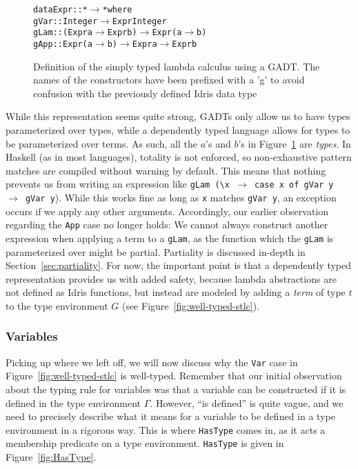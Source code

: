 \begin{figure}
\begin{alltt}
data Expr :: * \(\rightarrow\) * where
  gVar :: Integer \(\rightarrow\) Expr Integer
  gLam :: (Expr a \(\rightarrow\) Expr b) \(\rightarrow\) Expr (a \(\rightarrow\) b)
  gApp :: Expr (a \(\rightarrow\) b) \(\rightarrow\) Expr a \(\rightarrow\) Expr b 
\end{alltt}
\caption{Definition of the simply typed lambda calculus using a GADT. The names of the constructors have been prefixed with a 'g' to avoid confusion with the previously defined Idris data type}
\label{fig:stlc-GADT}
\end{figure}
While this representation seems quite strong, GADTs only allow us to have types parameterized over types, while a dependently typed language allows for types to be parameterized over terms. As such, all the $a$'s and $b$'s in Figure~\ref{fig:stlc-GADT} are \emph{types}. In Haskell (as in most languages), totality is not enforced, so non-exhaustive pattern matches are compiled without warning by default. This means that nothing prevents us from writing an expression like \texttt{gLam (\textbackslash{x} $\rightarrow$ case x of gVar y $\rightarrow$ gVar y}). While this works fine as long as \texttt{x} matches \texttt{gVar y}, an exception occurs if we apply any other arguments. Accordingly, our earlier observation regarding the \texttt{App} case no longer holds: We cannot always construct another expression when applying a term to a \texttt{gLam}, as the function which the \texttt{gLam} is parameterized over might be partial. Partiality is discussed in-depth in Section~\ref{sec:partiality}. For now, the important point is that a dependently typed representation provides us with added safety, because lambda abstractions are not defined as Idris functions, but instead are modeled by adding a \emph{term} of type $t$ to the type environment $G$ (see Figure~\ref{fig:well-typed-stlc}).

\subsubsection{Variables}
Picking up where we left off, we will now discuss why the \texttt{Var} case in Figure~\ref{fig:well-typed-stlc} is well-typed. Remember that our initial observation about the typing rule for variables was that a variable can be constructed if it is defined in the type environment $\Gamma$. However, ``is defined'' is quite vague, and we need to precisely describe what it means for a variable to be defined in a type environment in a rigorous way. This is where \texttt{HasType} comes in, as it acts a membership predicate on a type environment. \texttt{HasType} is given in Figure~\ref{fig:HasType}.

